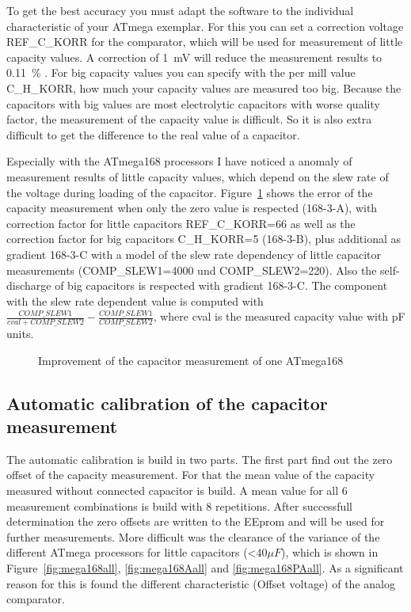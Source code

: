 To get the best accuracy you must adapt the software to the individual characteristic of your ATmega exemplar.
For this you can set a correction voltage REF\_C\_KORR for the comparator, which will be used for measurement of little capacity values.
A correction of 1~mV will reduce the measurement results to 0.11~\% .
For big capacity values you can specify with the per mill value C\_H\_KORR, how much your capacity values are measured too big.
Because the capacitors with big values are most electrolytic capacitors with worse quality factor, the measurement of
the capacity value is difficult. So it is also extra difficult to get the difference to the real value of a capacitor.

Especially with the ATmega168 processors I have noticed a anomaly of measurement results of little capacity values,
which depend on the slew rate of the voltage during loading of the capacitor.
Figure~\ref{fig:mega168optcap} shows the error of the capacity measurement when only the zero value is respected
(168-3-A), with correction factor for little capacitors REF\_C\_KORR=66 as well as the correction factor for big
capacitors C\_H\_KORR=5 (168-3-B), plus additional as gradient 168-3-C  with a model of the slew rate dependency of little capacitor 
measurements (COMP\_SLEW1=4000 und COMP\_SLEW2=220). Also the self-discharge of big capacitors is respected with gradient 168-3-C.
The component with the slew rate dependent value is computed with \(\frac{COMP\_SLEW1}{cval+COMP\_SLEW2} - \frac{COMP\_SLEW1}{COMP\_SLEW2}\),
where cval is the measured capacity value with pF units.

\begin{figure}[H]
\centering

\caption{Improvement of the capacitor measurement of one ATmega168}
\label{fig:mega168optcap}
\end{figure}

\subsection{Automatic calibration of the capacitor measurement}

The automatic calibration is build in two parts. The first part find out the zero offset of the capacity measurement.
For that the mean value of the capacity measured without connected capacitor is build. 
A mean value for all 6 measurement combinations is build with 8 repetitions.
After successfull determination the zero offsets are written to the EEprom and will be used for further measurements.
More difficult was the clearance of the variance of the different ATmega processors for little capacitors (\textless \(40 \mu F\)),
which is shown in Figure~\ref{fig:mega168all}, \ref{fig:mega168Aall} and \ref{fig:mega168PAall}.
As a significant reason for this is found the different characteristic (Offset voltage) of the analog comparator.

